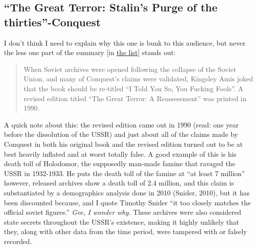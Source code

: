 \subsection{``The Great Terror: Stalin's Purge of the thirties''-Conquest}
I don't think I need to explain why this one is bunk to this audience, but never the less one part of the summary [in \href{https://www.reddit.com/r/EnoughCommieSpam/wiki/anti_commie_resources}{the list}] stands out:
\begin{quote}
    When Soviet archives were opened following the collapse of the Soviet Union, and many of Conquest's claims were validated, Kingsley Amis joked that the book should be re-titled ``I Told You So, You Fucking Fools''.
    A revised edition titled ``The Great Terror: A Reassessment'' was printed in 1990.
\end{quote}
A quick note about this: the revised edition came out in 1990 (read: one year before the dissolution of the USSR) and just about all of the claims made by Conquest in both his original book and the revised edition turned out to be at best heavily inflated and at worst totally false.
A good example of this is his death toll of Holodomor, the supposedly man-made famine that ravaged the USSR in 1932-1933.
He puts the death toll of the famine at ``at least 7 million'' however, released archives show a death toll of 2.4 million, and this claim is substantiated by a demographics analysis done in 2010 (Snider, 2010), but it has been discounted because, and I quote Timothy Snider ``it too closely matches the official soviet figures.''
\emph{Gee, I wonder why.}
These archives were also considered state secrets throughout the USSR's existence, making it highly unlikely that they, along with other data from the time period, were tampered with or falsely recorded.



